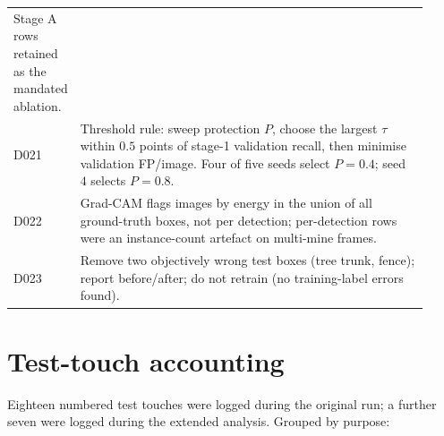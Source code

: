 \begin{table}[t]
\begin{tabular}{@{}p{0.055\linewidth}p{0.86\linewidth}@{}}
Stage A rows retained as the mandated ablation. \\
D021 & Threshold rule: sweep protection $P$, choose the largest $\tau$ within
$0.5$ points of stage-1 validation recall, then minimise validation FP/image.
Four of five seeds select $P=0.4$; seed $4$ selects $P=0.8$. \\
D022 & Grad-CAM flags images by energy in the union of all ground-truth boxes,
not per detection; per-detection rows were an instance-count artefact on
multi-mine frames. \\
D023 & Remove two objectively wrong test boxes (tree trunk, fence); report
before/after; do not retrain (no training-label errors found). \\
\bottomrule
\end{tabular}
\end{table}

\section{Test-touch accounting}
\label{app:touches}

Eighteen numbered test touches were logged during the original run; a further
seven were logged during the extended analysis. Grouped by purpose:

